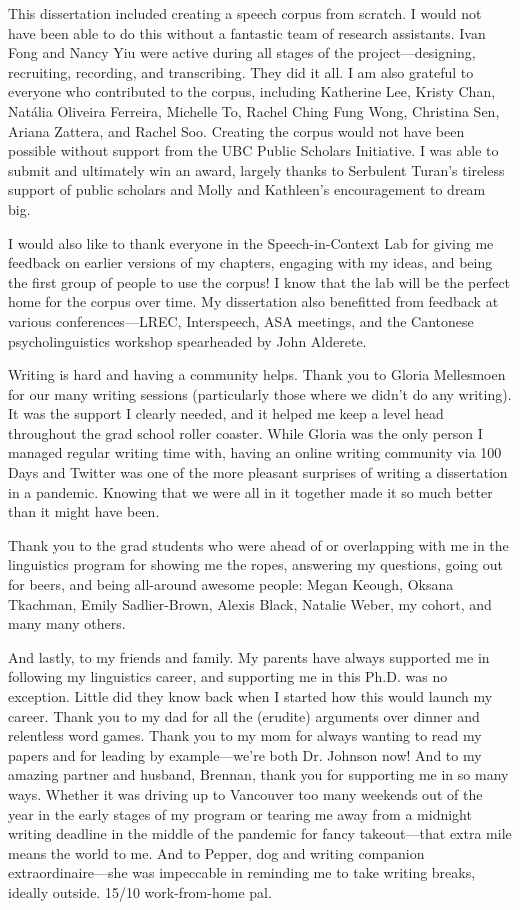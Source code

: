 This dissertation included creating a speech corpus from scratch. I would not have been able to do this without a fantastic team of research assistants. Ivan Fong and Nancy Yiu were active during all stages of the project---designing, recruiting, recording, and transcribing. They did it all. I am also grateful to everyone who contributed to the corpus, including Katherine Lee, Kristy Chan, Natália Oliveira Ferreira, Michelle To, Rachel Ching Fung Wong, Christina Sen, Ariana Zattera, and Rachel Soo. Creating the corpus would not have been possible without support from the UBC Public Scholars Initiative. I was able to submit and ultimately win an award, largely thanks to Serbulent Turan's tireless support of public scholars and Molly and Kathleen's encouragement to dream big. 

I would also like to thank everyone in the Speech-in-Context Lab for giving me feedback on earlier versions of my chapters, engaging with my ideas, and being the first group of people to use the corpus! I know that the lab will be the perfect home for the corpus over time. My dissertation also benefitted from feedback at various conferences---LREC, Interspeech, ASA meetings, and the Cantonese psycholinguistics workshop spearheaded by John Alderete.

Writing is hard and having a community helps. Thank you to Gloria Mellesmoen for our many writing sessions (particularly those where we didn't do any writing). It was the support I clearly needed, and it helped me keep a level head throughout the grad school roller coaster. While Gloria was the only person I managed regular writing time with, having an online writing community via 100 Days and Twitter was one of the more pleasant surprises of writing a dissertation in a pandemic. Knowing that we were all in it together made it so much better than it might have been.

Thank you to the grad students who were ahead of or overlapping with me in the linguistics program for showing me the ropes, answering my questions, going out for beers, and being all-around awesome people: Megan Keough, Oksana Tkachman, Emily Sadlier-Brown, Alexis Black, Natalie Weber, my cohort, and many many others.

And lastly, to my friends and family. My parents have always supported me in following my linguistics career, and supporting me in this Ph.D. was no exception. Little did they know back when I started how this would launch my career. Thank you to my dad for all the (erudite) arguments over dinner and relentless word games. Thank you to my mom for always wanting to read my papers and for leading by example---we're both Dr. Johnson now! And to my amazing partner and husband, Brennan, thank you for supporting me in so many ways. Whether it was driving up to Vancouver too many weekends out of the year in the early stages of my program or tearing me away from a midnight writing deadline in the middle of the pandemic for fancy takeout---that extra mile means the world to me. And to Pepper, dog and writing companion extraordinaire---she was impeccable in reminding me to take writing breaks, ideally outside. 15/10 work-from-home pal. 

\endinput 